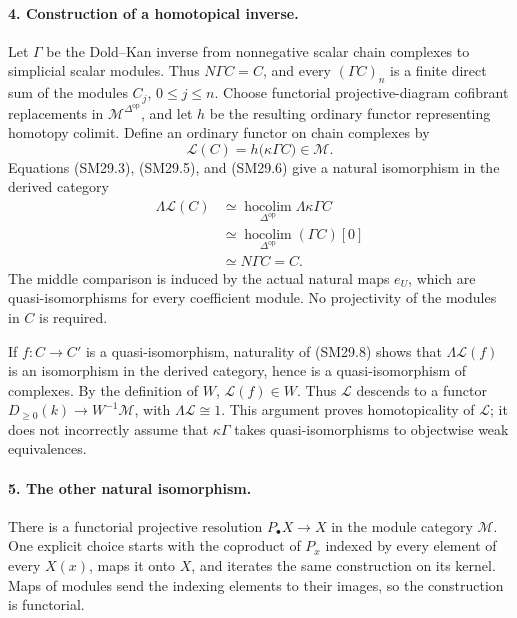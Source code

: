 \paragraph{4. Construction of a homotopical inverse.}
Let \(\Gamma\) be the Dold--Kan inverse from nonnegative
scalar chain complexes to simplicial scalar modules.
Thus \(N\Gamma C=C\), and every \((\Gamma C)_n\) is a
finite direct sum of the modules \(C_j\), \(0\le j\le n\).
Choose functorial projective-diagram cofibrant replacements
in \(\mathcal M^{\Delta^{\mathrm{op}}}\), and let \(h\) be
the resulting ordinary functor representing homotopy colimit.
Define an ordinary functor on chain complexes by
\[
 \mathcal L(C)=h\bigl(\kappa\Gamma C\bigr)\in\mathcal M.
 \tag{SM29.7}
\]
Equations (SM29.3), (SM29.5), and (SM29.6) give a natural
isomorphism in the derived category
\[
 \begin{split}
 \Lambda\mathcal L(C)
 &\simeq\operatorname*{hocolim}_{\Delta^{\mathrm{op}}}
               \Lambda\kappa\Gamma C\\
 &\simeq\operatorname*{hocolim}_{\Delta^{\mathrm{op}}}
               (\Gamma C)[0]\\
 &\simeq N\Gamma C=C.
 \end{split}
 \tag{SM29.8}
\]
The middle comparison is induced by the actual natural maps
\(e_U\), which are quasi-isomorphisms for every coefficient
module.  No projectivity of the modules in \(C\) is required.

If \(f:C\to C'\) is a quasi-isomorphism, naturality of
(SM29.8) shows that \(\Lambda\mathcal L(f)\) is an
isomorphism in the derived category, hence is a
quasi-isomorphism of complexes.
By the definition of \(W\), \(\mathcal L(f)\in W\).
Thus \(\mathcal L\) descends to a functor
\(D_{\ge0}(k)\to W^{-1}\mathcal M\), with
\(\Lambda\mathcal L\cong1\).
This argument proves homotopicality of \(\mathcal L\);
it does not incorrectly assume that \(\kappa\Gamma\)
takes quasi-isomorphisms to objectwise weak equivalences.

\paragraph{5. The other natural isomorphism.}
There is a functorial projective resolution \(P_\bullet X\to X\)
in the module category \(\mathcal M\).
One explicit choice starts with the coproduct of \(P_x\)
indexed by every element of every \(X(x)\), maps it onto
\(X\), and iterates the same construction on its kernel.
Maps of modules send the indexing elements to their images,
so the construction is functorial.

